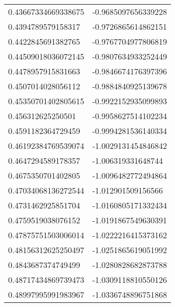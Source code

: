 \begin{supertabular}{ll}
0.43667334669338675 & -0.9685097656339228   \\
0.4394789579158317  & -0.9726865614862151   \\
0.4422845691382765  & -0.9767704977806819   \\
0.44509018036072145 & -0.9807634933252449   \\
0.4478957915831663  & -0.9846674176397396   \\
0.4507014028056112  & -0.9884840925139678   \\
0.45350701402805615 & -0.9922152935099893   \\
0.456312625250501   & -0.9958627514102234   \\
0.4591182364729459  & -0.9994281536140334   \\
0.46192384769539074 & -1.0029131454846842   \\
0.4647294589178357  & -1.006319331648744    \\
0.4675350701402805  & -1.0096482772494864   \\
0.47034068136272544 & -1.012901509156566    \\
0.4731462925851704  & -1.0160805171332434   \\
0.4759519038076152  & -1.0191867549630391   \\
0.47875751503006014 & -1.0222216415373162   \\
0.48156312625250497 & -1.0251865619051992   \\
0.4843687374749499  & -1.0280828682873788   \\
0.48717434869739473 & -1.0309118810550126   \\
0.48997995991983967 & -1.0336748896751868   \\
\end{supertabular}
